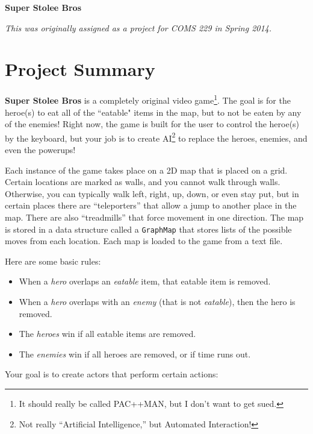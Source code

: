 \documentclass[11pt]{article}
\begin{document}
\thispagestyle{empty}

\begin{center}\large\bf
Super Stolee Bros
\end{center}

\textit{This was originally assigned as a project for COMS 229 in Spring 2014.}


\section{Project Summary}

\textbf{Super Stolee Bros}  is a completely original video game\footnote{It should really be called PAC++MAN, but I don't want to get sued.}.
The goal is for the heroe(s) to eat all of the ``eatable" items in the map, but to not be eaten by any of the enemies!
Right now, the game is built for the user to control the heroe(s) by the keyboard, but your job is to create AI\footnote{Not really ``Artificial Intelligence,'' but Automated Interaction!} to replace the heroes, enemies, and even the powerups!

Each instance of the game takes place on a 2D map that is placed on a grid. 
Certain locations are marked as walls, and you cannot walk through walls.
Otherwise, you can typically walk left, right, up, down, or even stay put, but in certain places there are ``teleporters'' that allow a jump to another place in the map.
There are also ``treadmills'' that force movement in one direction.
The map is stored in a data structure called a \texttt{GraphMap} that stores lists of the possible moves from each location.
Each map is loaded to the game from a text file.

Here are some basic rules:
\begin{itemize}
\item When a \emph{hero} overlaps an \emph{eatable} item, that eatable item is removed.
\item When a \emph{hero} overlaps with an \emph{enemy} (that is not \emph{eatable}), then the hero is removed.
\item The \emph{heroes} win if all eatable items are removed.
\item The \emph{enemies} win if all heroes are removed, or if time runs out.
\end{itemize}

Your goal is to create actors that perform certain actions:
\end{document}
